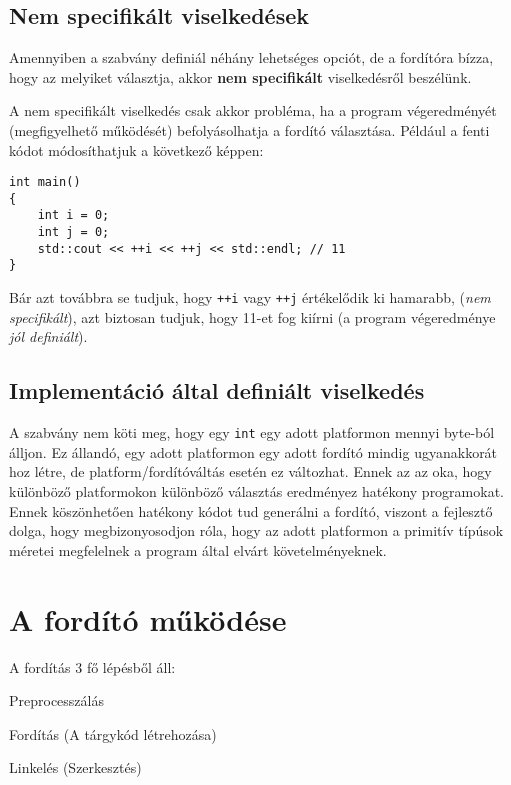 \documentclass[../cpp_book/cpp_book.tex]{subfiles}
\begin{document}
	\subsection{Nem specifikált viselkedések}
	Amennyiben a szabvány definiál néhány lehetséges opciót, de a fordítóra bízza, hogy az melyiket választja, akkor \textbf{nem specifikált} viselkedésről beszélünk.
	
  A nem specifikált viselkedés csak akkor probléma, ha a program végeredményét (megfigyelhető működését) befolyásolhatja a fordító választása. Például a fenti kódot módosíthatjuk a következő képpen:

	\begin{lstlisting}
int main()
{
	int i = 0;
	int j = 0;
	std::cout << ++i << ++j << std::endl; // 11
}
	\end{lstlisting}
	Bár azt továbbra se tudjuk, hogy \texttt{++i} vagy \texttt{++j} értékelődik ki hamarabb, (\textit{nem specifikált}), azt biztosan tudjuk, hogy 11-et fog kiírni (a program végeredménye \textit{jól definiált}).

	\subsection{Implementáció által definiált viselkedés}
	A szabvány nem köti meg, hogy egy \texttt{int} egy adott platformon mennyi byte-ból álljon. Ez állandó, egy adott platformon egy adott fordító mindig ugyanakkorát hoz létre, de platform/fordítóváltás esetén ez változhat. Ennek az az oka, hogy különböző platformokon különböző választás eredményez hatékony programokat. Ennek köszönhetően hatékony kódot tud generálni a fordító, viszont a fejlesztő dolga, hogy megbizonyosodjon róla, hogy az adott platformon a primitív típúsok méretei megfelelnek a program által elvárt követelményeknek.
	
	\section{A fordító működése}
	A fordítás 3 fő lépésből áll:
	\begin{compactenum}
		\item Preprocesszálás
		\item Fordítás (A tárgykód létrehozása)
		\item Linkelés (Szerkesztés)
	\end{compactenum}
	
\end{document}
